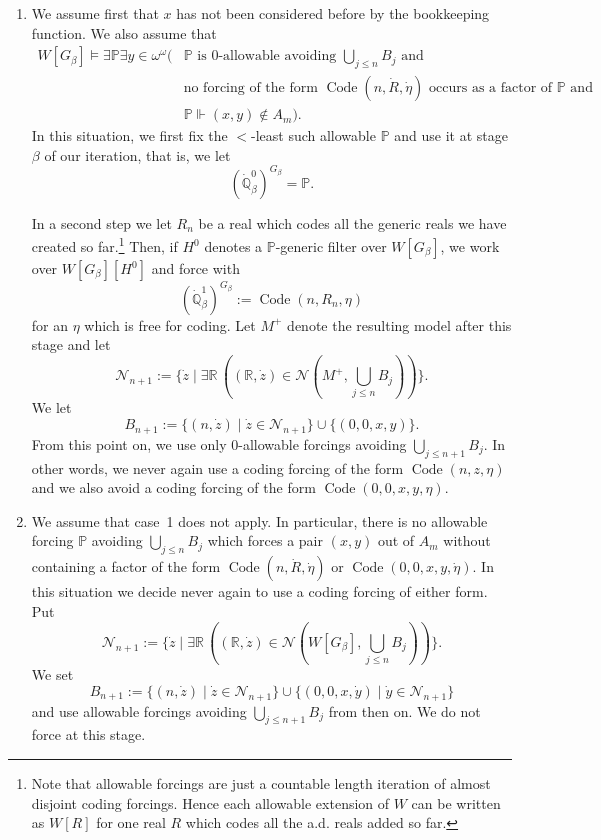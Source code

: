 \documentclass[a4paper,11pt]{article}
\newcommand{\forceP}{\mathbb{P}}
\newcommand{\forceQ}{\mathbb{Q}}
\newcommand{\forceR}{\mathbb{R}}
\begin{document}
\begin{enumerate}
\item We assume first that $x$ has not been considered before by the bookkeeping function. We also assume that
\begin{align*}
W[G_\beta]\models\exists\forceP\exists y\in\omega^\omega (&\forceP\text{ is $0$-allowable avoiding }\bigcup_{j\leq n}B_j\text{ and }\\
&\text{no forcing of the form }\operatorname{Code}(n,\dot R,\dot\eta)\text{ occurs as a factor of }\forceP\text{ and }\\
&\forceP\Vdash(x,y)\notin A_m).
\end{align*}
In this situation, we first fix the $<$-least such allowable $\forceP$ and use it at stage $\beta$ of our iteration, that is, we let
\[
(\dot{\forceQ}^0_\beta)^{G_\beta}=\forceP.
\]

In a second step we let $R_n$ be a real which codes all the generic reals we have created so far.\footnote{Note that allowable forcings are just a countable length iteration of almost disjoint coding forcings. Hence each allowable extension of $W$ can be written as $W[R]$ for one real $R$ which codes all the a.d. reals added so far.}
Then, if $H^0$ denotes a $\forceP$-generic filter over $W[G_\beta]$, we work over $W[G_\beta][H^0]$ and force with
\[
(\dot{\forceQ}^1_\beta)^{G_\beta}:=\operatorname{Code}(n,R_n,\eta)
\]
for an $\eta$ which is free for coding. Let $M^+$ denote the resulting model after this stage and let
\[
\mathcal N_{n+1}:=\{\dot z\mid \exists\forceR\,((\forceR,\dot z)\in
\mathcal N(M^+,\bigcup_{j\leq n}B_j))\}.
\]
We let
\[
B_{n+1}:=\{(n,\dot z)\mid \dot z\in\mathcal N_{n+1}\}\cup\{(0,0,x,y)\}.
\]
From this point on, we use only $0$-allowable forcings avoiding $\bigcup_{j\leq n+1}B_j$. In other words, we never again use a coding forcing of the form $\operatorname{Code}(n,z,\eta)$ and we also avoid a coding forcing of the form $\operatorname{Code}(0,0,x,y,\eta)$.

\item We assume that case~1 does not apply. In particular, there is no allowable forcing $\forceP$ avoiding $\bigcup_{j\leq n}B_j$ which forces a pair $(x,y)$ out of $A_m$ without containing a factor of the form $\operatorname{Code}(n,\dot R,\dot\eta)$ or $\operatorname{Code}(0,0,x,y,\dot\eta)$. In this situation we decide never again to use a coding forcing of either form. Put
\[
\mathcal N_{n+1}:=\{\dot z\mid \exists\forceR\,((\forceR,\dot z)\in
\mathcal N(W[G_\beta],\bigcup_{j\leq n}B_j))\}.
\]
We set
\[
B_{n+1}:=\{(n,\dot z)\mid\dot z\in\mathcal N_{n+1}\}
\cup
\{(0,0,x,\dot y)\mid\dot y\in\mathcal N_{n+1}\}
\]
and use allowable forcings avoiding $\bigcup_{j\leq n+1}B_j$ from then on. We do not force at this stage.


\end{enumerate}
\end{document}
